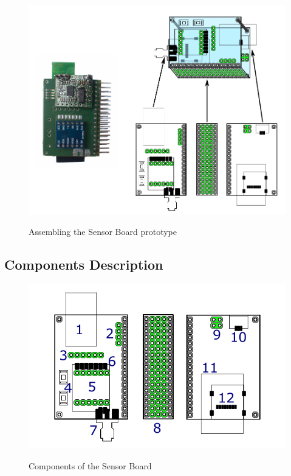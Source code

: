 \begin{figure}[H]
	\centering
	\includegraphics[scale=1]{img/assemblingHW.pdf}
	\label{HWassembling}
	\caption{Assembling the Sensor Board prototype}
\end{figure}

\subsection{Components Description}

\begin{figure}[H]
	\centering
	\includegraphics[scale=1]{img/componentsDescription.pdf}
	\label{HWcomponents}
	\caption{Components of the Sensor Board}
\end{figure}

